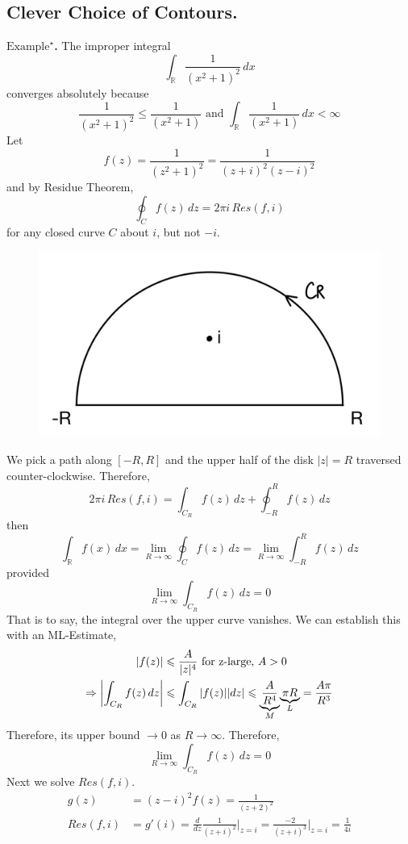 \documentclass[11pt]{article}
\DeclarePairedDelimiter\abs{\lvert}{\rvert}
\begin{document}
\subsection{Clever Choice of Contours.}
\textbf{$\text{Example}^\star$.} The improper integral 
$$ \int_{\mathbb{R}}\frac{1}{(x^2 + 1)^2} \, dx$$
converges absolutely because 
$$ \frac{1}{(x^2 + 1)^2} \leqslant \frac{1}{(x^2 + 1)} \text{ and } \int_{\mathbb{R}}\frac{1}{(x^2 + 1)} \, dx < \infty$$
Let 
$$ f(z) = \frac{1}{(z^2 + 1)^2} = \frac{1}{(z + i)^2(z - i)^2} $$
and by Residue Theorem, 
$$ \oint_C f(z) \,dz = 2\pi i\, Res(f, i)$$
for any closed curve $C$ about $i$, but not $-i$. \\
\begin{figure}
\includegraphics[scale=0.2]{21_2} 
\centering
\end{figure}
\newline
\newpage
We pick a path along $[-R, R]$ and the upper half of the disk $|z| = R$ traversed counter-clockwise. Therefore,
$$2\pi i \, Res(f, i) = \int_{C_R}f(z) \, dz + \oint_{-R}^{R}f(z) \, dz$$
then 
$$ \int_{\mathbb{R}} f(x) \, dx = \lim_{R \to \infty} \oint_C f(z) \, dz = \lim_{R \to \infty} \int_{-R}^{R} f(z) \, dz$$
provided
$$\lim_{R \to \infty} \int_{C_R} f(z) \, dz = 0$$
That is to say, the integral over the upper curve vanishes. We can establish this with an ML-Estimate, 
\begin{align*}
\abs{f(z)} &\leqslant \frac{A}{|z|^4} \text{ for z-large}, \,A > 0 \\
\Rightarrow \abs*{\int_{C_R}f(z) \, dz} &\leqslant \int_{C_R}|f(z)||dz| \leqslant {\underbrace{\frac{A}{R^4}}_{M}}{\underbrace{\pi R}_{L}} = \frac{A\pi}{R^3}
\end{align*}
Therefore, its upper bound $\to 0$ as $R \to \infty$. Therefore, 
$$\lim_{R \to \infty} \int_{C_R} f(z) \, dz = 0$$ 
Next we solve $Res(f, i)$. 
\begin{align*}
g(z) &= (z - i)^2f(z) = \frac{1}{(z + 2)^2} \\ 
Res(f, i) &= g'(i) = \frac{d}{dz}\frac{1}{(z + i)^2}\bigg\rvert_{z = i} = \frac{-2}{(z + i)^3}\bigg\rvert_{z = i} = \frac{1}{4i}
\end{align*}
\end{document}
